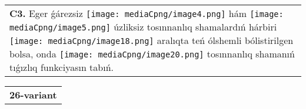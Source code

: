 \documentclass{article}
\begin{document}
\begin{tabular}{m{17cm}}
 \\
\textbf{C3.} Eger ǵárezsiz \texttt{[image: mediaCpng/image4.png]} hám \texttt{[image: mediaCpng/image5.png]} úzliksiz tosınnanlıq shamalardıń hárbiri \texttt{[image: mediaCpng/image18.png]} aralıqta teń ólshemli bólistirilgen bolsa, onda \texttt{[image: mediaCpng/image20.png]} tosınnanlıq shamanıń tıǵızlıq funkciyasın tabıń.
 \\

\end{tabular}
\vspace{1cm}


\begin{tabular}{m{17cm}}
\textbf{26-variant}
\newline


\end{tabular}
\end{document}
